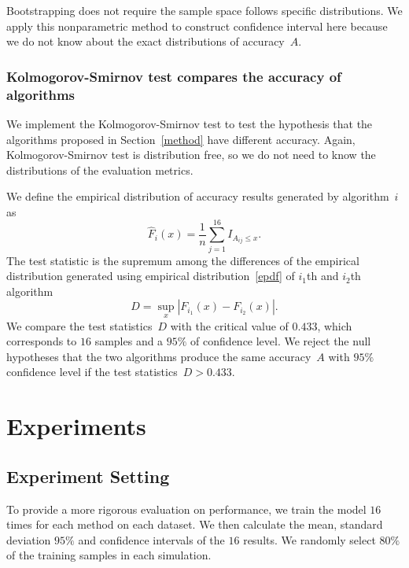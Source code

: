 \documentclass[12pt]{article} %
\begin{document}
Bootstrapping does not require the sample space follows specific distributions. We apply this nonparametric method to construct confidence interval here because we do not know about the exact distributions of accuracy~$A$.

\subsubsection{Kolmogorov-Smirnov test compares the accuracy of algorithms}\label{sec:ks}
We implement the Kolmogorov-Smirnov test to test the hypothesis that the algorithms proposed in Section~\ref{method} have different accuracy.  Again, Kolmogorov-Smirnov test is distribution free, so we do not need to know the distributions of the evaluation metrics.

We define the empirical distribution of accuracy results generated by algorithm~$i$ as
\begin{equation}\label{epdf}
  \hat{F}_{i}(x)=\frac{1}{n}\sum_{j=1}^{16}I_{A_{ij} \leq x}.
\end{equation}
The test statistic is the supremum among the differences of the empirical distribution generated using empirical distribution~\eqref{epdf} of $i_1$th and $i_2$th algorithm \citep{Walck:1996cca}
\begin{equation}\label{teststatistic}
D=\sup _{x}\left|F_{i_1}(x)-F_{i_2}(x)\right|.
\end{equation}
We compare the test statistics~$D$ with the critical value of $0.433$, which corresponds to $16$ samples and a $95\%$ of confidence level. We reject the null hypotheses that the two algorithms produce the same accuracy~$A$ with $95\%$ confidence level if the test statistics~$D>0.433$.
\section{Experiments}\label{result}

\subsection{Experiment Setting}
To provide a more rigorous evaluation on performance, we train the model $16$ times for each method on each dataset. We then calculate the mean, standard deviation $95\%$ and confidence intervals of the $16$ results.
We randomly select $80\%$ of the training samples in each simulation.
\end{document}
